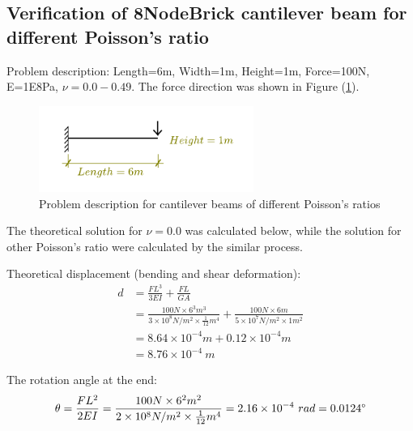 \documentclass[fleqn,11pt,letter]{article}
\begin{document}
\newpage
\subsection{Verification of 8NodeBrick cantilever beam for different Poisson's ratio}




Problem description: Length=6m, Width=1m, Height=1m, Force=100N, E=1E8Pa, $\nu=0.0-0.49$. The force direction was shown in Figure (\ref{fig Problem description for cantilever beams of different Poisson's ratios}). 

\begin{figure}[H]
  \centering
  \includegraphics[width=7cm]{../Figure_files/8NodeBrick/cantilever_6.pdf}
  \caption{Problem description for cantilever beams of different Poisson's ratios}
  \label{fig Problem description for cantilever beams of different Poisson's ratios}
\end{figure}

The theoretical solution for $\nu=0.0$ was calculated below, while the solution for other Poisson's ratio were calculated by the similar process. 

Theoretical displacement (bending and shear deformation):
\begin{equation}
  \begin{aligned}
  d &=\frac{FL^3}{3EI}+\frac{FL}{GA} \\ 
    &= \frac{100 N \times 6^3 m^3}{3\times 10^8 N/m^2 \times \frac{1}{12} m^4}+ 
    \frac{100 N\times 6 m}{5\times 10^7 N/m^2\times 1 m^2} \\ 
    &=8.64\times 10^{-4} m + 0.12 \times 10^{-4} m  \\
   & =8.76\times 10^{-4} \ m
   \end{aligned}
\end{equation}

The rotation angle at the end:
\begin{equation}
  \theta =\frac{FL^2}{2EI} 
   =\frac{100 N \times 6^2 m^2} {2\times 10^8 N/m^2 \times \frac{1}{12} m^4} 
 =2.16 \times 10^{-4} \ rad = 0.0124 \degree 
\end{equation}
\end{document}
